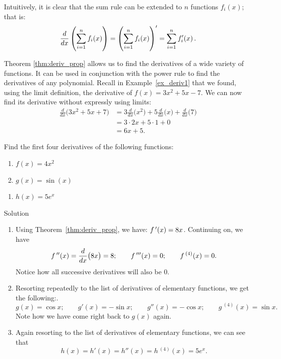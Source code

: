 Intuitively, it is clear that the sum rule can be extended to $n$ functions $f_i(x)$; that is:
$$
\dfrac{d}{d x}\displaystyle\left(\sum_{i=1}^nf_i(x)\right)=\displaystyle\left(\sum_{i=1}^nf_i(x)\right)'=\displaystyle\sum_{i=1}^nf'_i(x)\,.
$$


\fi
\fi

Theorem \ref{thm:deriv_prop} allows us to find the derivatives of a wide variety of functions. It can be used in conjunction with the power rule to find the derivatives of any polynomial. Recall in Example~\ref{ex_deriv1} that we found, using the limit definition, the derivative of $f(x) = 3x^2+5x-7$. We can now find its derivative without expressly using limits:
		\begin{align*}
		\frac{d}{dx}\Big(3x^2+5x+7\Big) &= 3\frac{d}{dx}\Big(x^2\Big) + 5\frac{d}{dx}\Big(x\Big) + \frac{d}{dx}\Big(7\Big) \\[0.2cm]
																		&= 3\cdot 2x+5\cdot 1+ 0\\
																		&= 6x+5.
		\end{align*}


\ifcalculus
\begin{example}\label{ex_high_order}
Find the first four derivatives of the following functions:
	
	
	\noindent\begin{minipage}[t]{.5\textwidth}
	\begin{enumerate}
	\item		$f(x) = 4x^2$
	\item		$g(x) = \sin (x)$
	\end{enumerate}
	\end{minipage}
	\noindent\begin{minipage}[t]{.5\textwidth}
	\begin{enumerate}\addtocounter{enumi}{2}
	\item		$h(x) = 5e^x$
	\end{enumerate}
	\end{minipage}

Solution 

\begin{enumerate}
	\item		Using Theorem~\ref{thm:deriv_prop}, we have: $f\,'(x) = 8x$. Continuing on, we have 
	$$f\,''(x) = \frac{d}{dx}\big(8x\big) = 8;\qquad f\,'''(x) = 0;\qquad f\,^{(4)}(x) = 0.$$ Notice how all successive derivatives will also be 0.
	\item		Resorting repeatedly to the list of derivatives of elementary functions, we get the following:.
	$$g(x) = \cos x;\qquad g'(x) = -\sin x;\qquad g''(x) = -\cos x;\qquad g\,^{(4)}(x) = \sin x.$$ Note how we have come right back to $g(x)$ again. 
	\item		Again resorting  to the list of derivatives of elementary functions, we can see that $$h(x) = h'(x) = h''(x) = h\,^{(4)}(x) = 5e^x.$$
	\end{enumerate}
\end{example}


